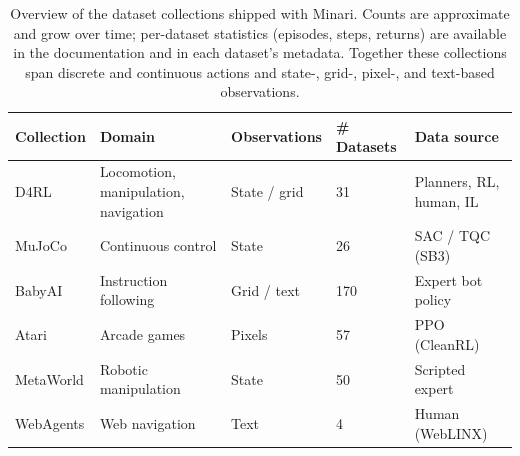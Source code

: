 \documentclass{article}
\begin{document}
\begin{table}[h]
    \centering
    \footnotesize
    \begin{tabular}{@{}lllll@{}}
    \toprule
    \textbf{Collection} & \textbf{Domain} & \textbf{Observations} & \textbf{\# Datasets} & \textbf{Data source} \\
    \midrule
    D4RL      & Locomotion, manipulation, navigation & State / grid & 31  & Planners, RL, human, IL \\
    MuJoCo    & Continuous control                   & State        & 26  & SAC / TQC (SB3) \\
    BabyAI    & Instruction following                & Grid / text  & 170 & Expert bot policy \\
    Atari     & Arcade games                         & Pixels       & 57  & PPO (CleanRL) \\
    MetaWorld & Robotic manipulation                 & State        & 50  & Scripted expert \\
    WebAgents & Web navigation                       & Text         & 4   & Human (WebLINX) \\
    \bottomrule
    \end{tabular}
    \caption{Overview of the dataset collections shipped with Minari. Counts are approximate and grow over time; per-dataset statistics (episodes, steps, returns) are available in the documentation and in each dataset's metadata. Together these collections span discrete and continuous actions and state-, grid-, pixel-, and text-based observations.}
    \label{tab:collections}
\end{table}
\end{document}
